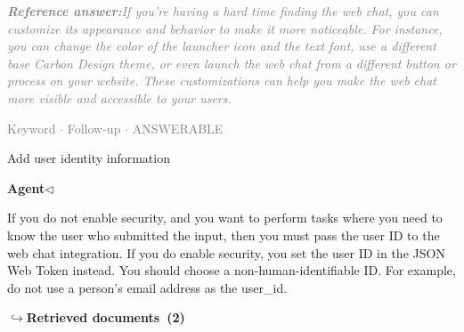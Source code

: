 \documentclass[a4paper,11pt]{article}
\begin{document}
\begin{refanswerenv}
{\footnotesize\textit{\textcolor{gray}{\textbf{Reference answer:}\enspace If you're having a hard time finding the web chat, you can customize its appearance and behavior to make it more noticeable. For instance, you can change the color of the launcher icon and the text font, use a different base Carbon Design theme, or even launch the web chat from a different button or process on your website. These customizations can help you make the web chat more visible and accessible to your users.}}}
\end{refanswerenv}
\vspace{0.5em}
\hfill{\tiny\textcolor{gray}{Keyword $\cdot$ Follow-up $\cdot$ ANSWERABLE}}
\begin{userbubble}
Add user identity information
\end{userbubble}
\noindent\hfill{\small\textcolor{agentcolor}{\textbf{Agent\enspace$\triangleleft$}}}
\begin{agentbubble}
If you do not enable security, and you want to perform tasks where you need to know the user who submitted the input, then you must pass the user ID to the web chat integration. If you do enable security, you set the user ID in the JSON Web Token instead. You should choose a non-human-identifiable ID. For example, do not use a person's email address as the user\_id.
\end{agentbubble}
\noindent\hfill{\footnotesize\textcolor{doccolor}{\textbf{$\hookrightarrow$\enspace Retrieved documents~(2)}}}
\end{document}
